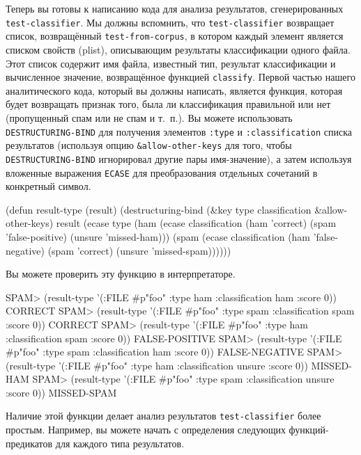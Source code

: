 Теперь вы готовы к написанию кода для анализа результатов, сгенерированных
\lstinline{test-classifier}.  Мы должны вспомнить, что \lstinline{test-classifier} возвращает
список, возвращённый \lstinline{test-from-corpus}, в котором каждый элемент является списком
свойств (plist), описывающим результаты классификации одного файла.  Этот список содержит
имя файла, известный тип, результат классификации и вычисленное значение, возвращённое
функцией \lstinline{classify}.  Первой частью нашего аналитического кода, который вы должны
написать, является функция, которая будет возвращать признак того, была ли классификация
правильной или нет (пропущенный спам или не спам и т.~п.).  Вы можете использовать
\lstinline{DESTRUCTURING-BIND} для получения элементов \lstinline{:type} и \lstinline{:classification}
списка результатов (используя опцию \lstinline!&allow-other-keys! для того, чтобы
\lstinline{DESTRUCTURING-BIND} игнорировал другие пары имя-значение), а затем используя
вложенные выражения \lstinline{ECASE} для преобразования отдельных сочетаний в конкретный
символ.

\begin{myverb}
(defun result-type (result)
  (destructuring-bind (&key type classification &allow-other-keys) result
    (ecase type
      (ham
       (ecase classification
         (ham 'correct)
         (spam 'false-positive)
         (unsure 'missed-ham)))
      (spam
       (ecase classification
         (ham 'false-negative)
         (spam 'correct)
         (unsure 'missed-spam))))))
\end{myverb}

Вы можете проверить эту функцию в интерпретаторе.

\begin{myverb}
SPAM> (result-type '(:FILE #p"foo" :type ham :classification ham :score 0))
CORRECT
SPAM> (result-type '(:FILE #p"foo" :type spam :classification spam :score 0))
CORRECT
SPAM> (result-type '(:FILE #p"foo" :type ham :classification spam :score 0))
FALSE-POSITIVE
SPAM> (result-type '(:FILE #p"foo" :type spam :classification ham :score 0))
FALSE-NEGATIVE
SPAM> (result-type '(:FILE #p"foo" :type ham :classification unsure :score 0))
MISSED-HAM
SPAM> (result-type '(:FILE #p"foo" :type spam :classification unsure :score 0))
MISSED-SPAM
\end{myverb}

Наличие этой функции делает анализ результатов \lstinline{test-classifier} более простым.
Например, вы можете начать с определения следующих функций-предикатов для каждого типа
результатов.

